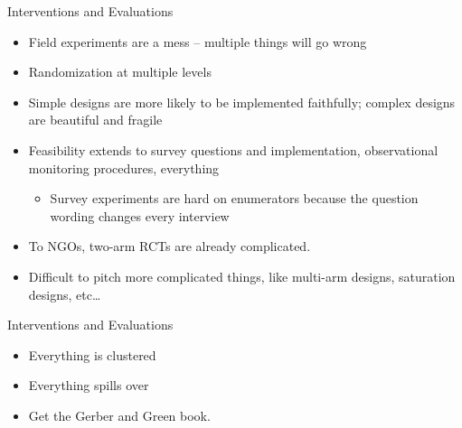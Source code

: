 \documentclass[11pt,ignorenonframetext,xcolor={svgnames}]{beamer}
\providecommand{\tightlist}{%
  \setlength{\itemsep}{0pt}\setlength{\parskip}{0pt}}
\begin{document}
\begin{frame}{Interventions and Evaluations}
\protect\hypertarget{interventions-and-evaluations-1}{}
\begin{itemize}
\tightlist
\item
  Field experiments are a mess -- multiple things will go wrong
\item
  Randomization at multiple levels
\item
  Simple designs are more likely to be implemented faithfully; complex
  designs are beautiful and fragile
\item
  Feasibility extends to survey questions and implementation,
  observational monitoring procedures, everything

  \begin{itemize}
  \tightlist
  \item
    Survey experiments are hard on enumerators because the question
    wording changes every interview
  \end{itemize}
\end{itemize}

\smallskip

\begin{itemize}
\tightlist
\item
  To NGOs, two-arm RCTs are already complicated.\\
\item
  Difficult to pitch more complicated things, like multi-arm designs,
  saturation designs, etc\ldots{}
\end{itemize}
\end{frame}

\begin{frame}{Interventions and Evaluations}
\protect\hypertarget{interventions-and-evaluations-2}{}
\begin{itemize}
\tightlist
\item
  Everything is clustered
\item
  Everything spills over
\end{itemize}

\bigskip

\begin{itemize}
\tightlist
\item
  Get the Gerber and Green book.
\end{itemize}
\end{frame}
\end{document}
